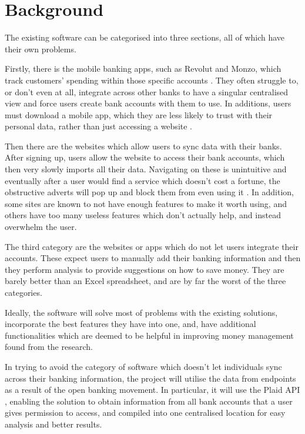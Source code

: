 \section{Background}
The existing software can be categorised into three sections, all of which have their own problems. 

Firstly, there is the mobile banking apps, such as Revolut and Monzo, which track customers' spending within those specific accounts \cite{RevolutBudgetting} \cite{MonzoBudgetting}. They often struggle to, or don't even at all, integrate across other banks to have a singular centralised view and force users create bank accounts with them to use. In additions, users must download a mobile app, which they are less likely to trust with their personal data, rather than just accessing a website \cite{AppVsWebsite}.

Then there are the websites which allow users to sync data with their banks. After signing up, users allow the website to access their bank accounts, which then very slowly imports all their data. Navigating on these is unintuitive and eventually after a user would find a service which doesn't cost a fortune, the obstructive adverts will pop up and block them from even using it \cite{PersonalFinanceAppsComparison}. In addition, some sites are known to not have enough features to make it worth using, and others have too many useless features which don't actually help, and instead overwhelm the user.

The third category are the websites or apps which do not let users integrate their accounts. These expect users to manually add their banking information and then they perform analysis to provide suggestions on how to save money. They are barely better than an Excel spreadsheet, and are by far the worst of the three categories.

Ideally, the software will solve most of problems with the existing solutions, incorporate the best features they have into one, and, have additional functionalities which are deemed to be helpful in improving money management found from the research.

In trying to avoid the category of software which doesn't let individuals sync across their banking information, the project will utilise the data from endpoints as a result of the open banking movement. In particular, it will use the Plaid API \cite{Plaid}, enabling the solution to obtain information from all bank accounts that a user gives permission to access, and compiled into one centralised location for easy analysis and better results.                                                                           